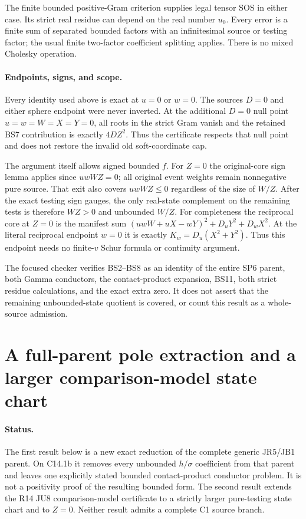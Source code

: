 The finite bounded positive-Gram criterion supplies legal tensor SOS
in either case. Its strict real residue can depend on the real number
$u_0$. Every error is a finite sum of separated bounded factors with
an infinitesimal source or testing factor; the usual finite two-factor
coefficient splitting applies. There is no mixed Cholesky operation.

\paragraph{Endpoints, signs, and scope.}
Every identity used above is exact at $u=0$ or $w=0$. The sources
$D=0$ and either sphere endpoint were never inverted. At the additional
$D=0$ null point $u=w=W=X=Y=0$, all roots in the strict Gram vanish
and the retained BS7 contribution is exactly $4DZ^2$.
Thus the certificate respects that null point and does not restore
the invalid old soft-coordinate cap.

The argument itself allows signed bounded $f$. For $Z=0$ the
original-core sign lemma applies since $uwWZ=0$; all original event
weights remain nonnegative pure source. That exit also covers
$uwWZ\le0$ regardless of the size of $W/Z$. After the exact testing
sign gauges, the only real-state complement on the remaining tests
is therefore $WZ>0$ and unbounded $W/Z$.
For completeness the reciprocal core at $Z=0$ is the manifest sum
$(uwW+uX-wY)^2+D_uY^2+D_wX^2$.
At the literal reciprocal endpoint $w=0$ it is exactly
$K_w=D_u(X^2+Y^2)$. Thus this endpoint needs no finite-$v$
Schur formula or continuity argument.

The focused checker verifies BS2--BS8 as an identity of the entire
SP6 parent, both Gamma conductors, the contact-product expansion,
BS11, both strict residue calculations, and the exact extra zero.
It does not assert that the remaining unbounded-state quotient is
covered, or count this result as a whole-source admission.


\section{\texorpdfstring{A full-parent pole extraction and a larger comparison-model state chart}{A full-parent pole extraction and a larger comparison-model state chart}}
\label{component:pfeca652aef94}

\label{pfeca652aef94:sec:r17-c1-sphere}

\paragraph{Status.}
The first result below is a new exact reduction of the complete generic
JR5/JB1 parent. On C14.1b it removes every unbounded $h/\sigma$
coefficient from that parent and leaves one explicitly stated bounded
contact-product conductor problem. It is not a positivity proof of the
resulting bounded form. The second result extends the R14 JU8
comparison-model certificate to a strictly larger pure-testing state
chart and to $Z=0$. Neither result admits a complete C1 source branch.

